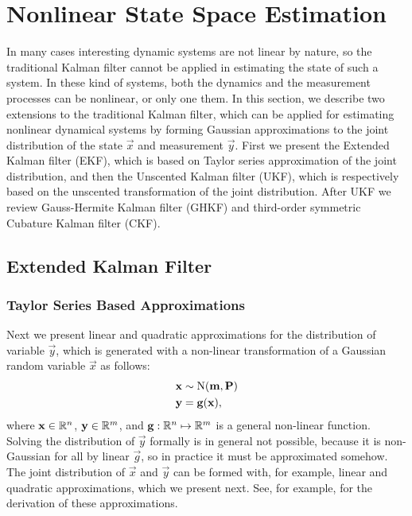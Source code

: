 %
\chapter{Nonlinear State Space Estimation}
\label{ch:nonlinear-estimation}
%

In many cases interesting dynamic systems are not linear by nature, so
the traditional Kalman filter cannot be applied in estimating the
state of such a system. In these kind of systems, both the dynamics
and the measurement processes can be nonlinear, or only one them. In
this section, we describe two extensions to the traditional Kalman
filter, which can be applied for estimating nonlinear dynamical
systems by forming Gaussian approximations to the joint distribution
of the state $\vec{x}$ and measurement $\vec{y}$. First we present the
Extended Kalman filter (EKF), which is based on Taylor series
approximation of the joint distribution, and then the Unscented Kalman
filter (UKF), which is respectively based on the unscented
transformation of the joint distribution. After UKF we review
Gauss-Hermite Kalman filter (GHKF) and third-order symmetric Cubature
Kalman filter (CKF).


%


\section{Extended Kalman Filter}


\subsection{Taylor Series Based Approximations}

Next we present linear and quadratic approximations for the
distribution of variable $\vec{y}$, which is generated with a non-linear transformation
of a Gaussian random variable $\vec{x}$ as follows:
%
\begin{equation}
\begin{split}
  \mathbf{x} &\sim \operatorname{N}(\mathbf{m},\mathbf{P}) \\
  \mathbf{y} &= \mathbf{g}(\mathbf{x}),
\end{split}
\label{eq:trans_g}
\end{equation}
%
where $\mathbf{x} \in \mathbb{R}^n$, $\mathbf{y} \in \mathbb{R}^m$, and $\mathbf{g} :
\mathbb{R}^n \mapsto \mathbb{R}^m$ is a general non-linear function. Solving
the distribution of $\vec{y}$ formally is in general not possible,
because it is non-Gaussian for all by linear $\vec{g}$, so in practice
it must be approximated somehow. The joint distribution of $\vec{x}$
and $\vec{y}$ can be formed with, for example, linear and quadratic
approximations, which we present next. See, for example, \citet{Bar-Shalom+Li+Kirubarajan:2001} for the derivation of these approximations.

